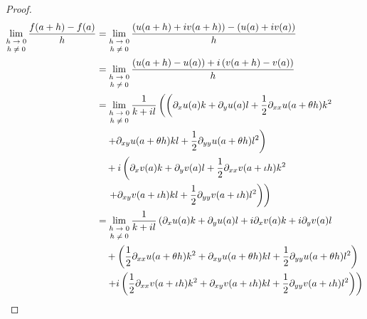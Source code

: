 \documentclass[dvipdfmx]{jsarticle}
\begin{document}
\begin{proof}
\begin{align*}
\lim_{\scriptsize \begin{matrix}
h \rightarrow 0 \\
h \neq 0 \\
\end{matrix}}\frac{f(a + h) - f(a)}{h} &= \lim_{\scriptsize \begin{matrix}
h \rightarrow 0 \\
h \neq 0 \\
\end{matrix}}\frac{\left( u(a + h) + iv(a + h) \right) - \left( u(a) + iv(a) \right)}{h}\\
&= \lim_{\scriptsize \begin{matrix}
h \rightarrow 0 \\
h \neq 0 \\
\end{matrix}}\frac{\left( u(a + h) - u(a) \right) + i\left( v(a + h) - v(a) \right)}{h}\\
&= \lim_{\scriptsize \begin{matrix}
h \rightarrow 0 \\
h \neq 0 \\
\end{matrix}}\frac{1}{k + il}\left( \left( \partial_{x}u(a)k + \partial_{y}u(a)l + \frac{1}{2}\partial_{xx}u(a + \theta h)k^{2} \right. \right. \\
&\quad \left. + \partial_{xy}u(a + \theta h)kl + \frac{1}{2}\partial_{yy}u(a + \theta h)l^{2} \right) \\
&\quad + i\left( \partial_{x}v(a)k + \partial_{y}v(a)l + \frac{1}{2}\partial_{xx}v(a + \iota h)k^{2} \right. \\
&\quad \left. \left. + \partial_{xy}v(a + \iota h)kl + \frac{1}{2}\partial_{yy}v(a + \iota h)l^{2} \right) \right)\\
&= \lim_{\scriptsize \begin{matrix}
h \rightarrow 0 \\
h \neq 0 \\
\end{matrix}}\frac{1}{k + il}\left( \partial_{x}u(a)k + \partial_{y}u(a)l + i\partial_{x}v(a)k + i\partial_{y}v(a)l \right. \\
&\quad + \left( \frac{1}{2}\partial_{xx}u(a + \theta h)k^{2} + \partial_{xy}u(a + \theta h)kl + \frac{1}{2}\partial_{yy}u(a + \theta h)l^{2} \right) \\
&\quad \left. + i\left( \frac{1}{2}\partial_{xx}v(a + \iota h)k^{2} + \partial_{xy}v(a + \iota h)kl + \frac{1}{2}\partial_{yy}v(a + \iota h)l^{2} \right) \right)\\

\end{align*}
\end{proof}
\end{document}
